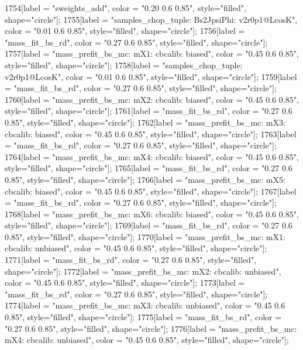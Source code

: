 {	1754[label = "sweights_add", color = "0.20 0.6 0.85", style="filled", shape="circle"];
	1755[label = "samples_chop_tuple\nmode: Bs2JpsiPhi\nversion: v2r0p1@LcosK", color = "0.01 0.6 0.85", style="filled", shape="circle"];
	1756[label = "mass_fit_bs_rd", color = "0.27 0.6 0.85", style="filled", shape="circle"];
	1757[label = "mass_prefit_bs_mc\nmassbin: mX1\nmassmodel: cbcalib\ntrigger: biased", color = "0.45 0.6 0.85", style="filled", shape="circle"];
	1758[label = "samples_chop_tuple\nversion: v2r0p1@LcosK", color = "0.01 0.6 0.85", style="filled", shape="circle"];
	1759[label = "mass_fit_bs_rd", color = "0.27 0.6 0.85", style="filled", shape="circle"];
	1760[label = "mass_prefit_bs_mc\nmassbin: mX2\nmassmodel: cbcalib\ntrigger: biased", color = "0.45 0.6 0.85", style="filled", shape="circle"];
	1761[label = "mass_fit_bs_rd", color = "0.27 0.6 0.85", style="filled", shape="circle"];
	1762[label = "mass_prefit_bs_mc\nmassbin: mX3\nmassmodel: cbcalib\ntrigger: biased", color = "0.45 0.6 0.85", style="filled", shape="circle"];
	1763[label = "mass_fit_bs_rd", color = "0.27 0.6 0.85", style="filled", shape="circle"];
	1764[label = "mass_prefit_bs_mc\nmassbin: mX4\nmassmodel: cbcalib\ntrigger: biased", color = "0.45 0.6 0.85", style="filled", shape="circle"];
	1765[label = "mass_fit_bs_rd", color = "0.27 0.6 0.85", style="filled", shape="circle"];
	1766[label = "mass_prefit_bs_mc\nmassbin: mX5\nmassmodel: cbcalib\ntrigger: biased", color = "0.45 0.6 0.85", style="filled", shape="circle"];
	1767[label = "mass_fit_bs_rd", color = "0.27 0.6 0.85", style="filled", shape="circle"];
	1768[label = "mass_prefit_bs_mc\nmassbin: mX6\nmassmodel: cbcalib\ntrigger: biased", color = "0.45 0.6 0.85", style="filled", shape="circle"];
	1769[label = "mass_fit_bs_rd", color = "0.27 0.6 0.85", style="filled", shape="circle"];
	1770[label = "mass_prefit_bs_mc\nmassbin: mX1\nmassmodel: cbcalib\ntrigger: unbiased", color = "0.45 0.6 0.85", style="filled", shape="circle"];
	1771[label = "mass_fit_bs_rd", color = "0.27 0.6 0.85", style="filled", shape="circle"];
	1772[label = "mass_prefit_bs_mc\nmassbin: mX2\nmassmodel: cbcalib\ntrigger: unbiased", color = "0.45 0.6 0.85", style="filled", shape="circle"];
	1773[label = "mass_fit_bs_rd", color = "0.27 0.6 0.85", style="filled", shape="circle"];
	1774[label = "mass_prefit_bs_mc\nmassbin: mX3\nmassmodel: cbcalib\ntrigger: unbiased", color = "0.45 0.6 0.85", style="filled", shape="circle"];
	1775[label = "mass_fit_bs_rd", color = "0.27 0.6 0.85", style="filled", shape="circle"];
	1776[label = "mass_prefit_bs_mc\nmassbin: mX4\nmassmodel: cbcalib\ntrigger: unbiased", color = "0.45 0.6 0.85", style="filled", shape="circle"];
}
